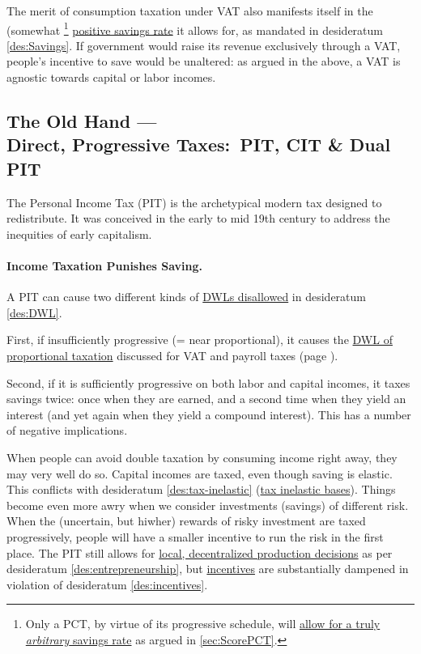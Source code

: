 The merit of consumption taxation under VAT also manifests itself in the (somewhat
\footnote{
	Only a PCT, by virtue of its progressive schedule, will \hyperref[sec:ScorePCT]{allow for a truly \emph{arbitrary} savings rate} as argued in \autoref{sec:ScorePCT}.
}
\hyperref[des:Savings]{positive savings rate} it allows for, as mandated in desideratum \ref{des:Savings}.
If government would raise its revenue exclusively through a VAT, people's incentive to save would be unaltered:
as argued in the above, a VAT is agnostic towards capital or labor incomes.

\subsection[Direct, Progressive Taxes]{The Old Hand ---\\Direct, Progressive Taxes:~PIT, CIT \& Dual PIT}
	\label{sec:ScorePIT}
The Personal Income Tax (PIT) is the archetypical modern tax designed to redistribute.
It was conceived in the early to mid 19th century to address the inequities of early capitalism.

\paragraph{Income Taxation Punishes Saving.}
A PIT can cause two different kinds of \hyperref[des:DWL]{DWLs disallowed} in desideratum \ref{des:DWL}.

First, if insufficiently progressive (= near proportional), it causes the \hyperref[sec:PropTaxDWL]{DWL of proportional taxation} discussed for VAT and payroll taxes (page \pageref{sec:PropTaxDWL}).

Second, if it is sufficiently progressive on both labor and capital incomes, it taxes savings twice:
once when they are earned, and a second time when they yield an interest (and yet again when they yield a compound interest).
This has a number of negative implications.

When people can avoid double taxation by consuming income right away, they may very well do so.
Capital incomes are taxed, even though saving is elastic.
This conflicts with desideratum \ref{des:tax-inelastic} (\hyperref[des:tax-inelastic]{tax inelastic bases}).
Things become even more awry when we consider investments (savings) of different risk.
When the (uncertain, but hiwher) rewards of risky investment are taxed progressively, people will have a smaller incentive to run the risk in the first place.
The PIT still allows for \hyperref[des:entrepreneurship]{local, decentralized production decisions} as per desideratum \ref{des:entrepreneurship}, but \hyperref[des:incentives]{incentives} are substantially dampened in violation of desideratum \ref{des:incentives}.

